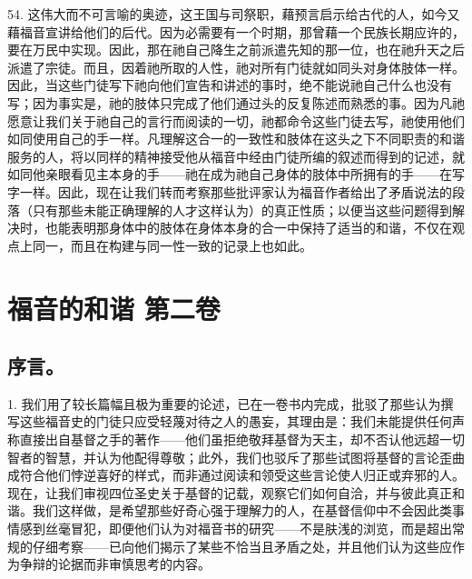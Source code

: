 54. 这伟大而不可言喻的奥迹，这王国与司祭职，藉预言启示给古代的人，如今又藉福音宣讲给他们的后代。因为必需要有一个时期，那曾藉一个民族长期应许的，要在万民中实现。因此，那在祂自己降生之前派遣先知的那一位，也在祂升天之后派遣了宗徒。而且，因着祂所取的人性，祂对所有门徒就如同头对身体肢体一样。因此，当这些门徒写下祂向他们宣告和讲述的事时，绝不能说祂自己什么也没有写；因为事实是，祂的肢体只完成了他们通过头的反复陈述而熟悉的事。因为凡祂愿意让我们关于祂自己的言行而阅读的一切，祂都命令这些门徒去写，祂使用他们如同使用自己的手一样。凡理解这合一的一致性和肢体在这头之下不同职责的和谐服务的人，将以同样的精神接受他从福音中经由门徒所编的叙述而得到的记述，就如同他亲眼看见主本身的手——祂在成为祂自己身体的肢体中所拥有的手——在写字一样。因此，现在让我们转而考察那些批评家认为福音作者给出了矛盾说法的段落（只有那些未能正确理解的人才这样认为）的真正性质；以便当这些问题得到解决时，也能表明那身体中的肢体在身体本身的合一中保持了适当的和谐，不仅在观点上同一，而且在构建与同一性一致的记录上也如此。\par



\section{福音的和谐 第二卷}

\par


\subsection{序言。}

1. 我们用了较长篇幅且极为重要的论述，已在一卷书内完成，批驳了那些认为撰写这些福音史的门徒只应受轻蔑对待之人的愚妄，其理由是：我们未能提供任何声称直接出自基督之手的著作——他们虽拒绝敬拜基督为天主，却不否认他远超一切智者的智慧，并认为他配得尊敬；此外，我们也驳斥了那些试图将基督的言论歪曲成符合他们悖逆喜好的样式，而非通过阅读和领受这些言论使人归正或弃邪的人。现在，让我们审视四位圣史关于基督的记载，观察它们如何自洽，并与彼此真正和谐。我们这样做，是希望那些好奇心强于理解力的人，在基督信仰中不会因此类事情感到丝毫冒犯，即便他们认为对福音书的研究——不是肤浅的浏览，而是超出常规的仔细考察——已向他们揭示了某些不恰当且矛盾之处，并且他们认为这些应作为争辩的论据而非审慎思考的内容。\par


